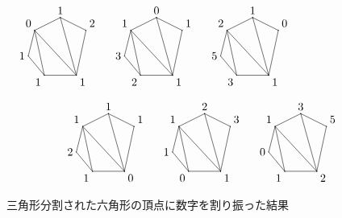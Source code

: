 \documentclass[12pt,twoside,dvipdfm]{jarticle}
\theoremstyle{definition} %
\theoremstyle{definition} %
\theoremstyle{definition} %
\numberwithin{theorem}{section}
\numberwithin{equation}{section}
\numberwithin{figure}{section}
\numberwithin{table}{section}
\begin{document}
\begin{figure}[hbtp!]
\[
\begin{xy}
{<0mm,0mm>;<1mm,0mm>:
(  0, 10)*+!D {1}="1",
(  8,  6)*+!LD{2}="2", 
(  5, -8)*+!LU{1}="4", 
( -5, -8)*+!UR{1}="5",
(-10, -2)*+!R {1}="6",
( -8,  6)*+!DR{0}="7", 
\ar@{-}"1";"2",
\ar@{-}"4";"5",
\ar@{-}"5";"6",
\ar@{-}"6";"7",
\ar@{-}"7";"1".
\ar@{-}"4";"2",
\ar@{-}"4";"1",
\ar@{-}"4";"7",
\ar@{-}"5";"7".
},
{<30mm,0mm>;<31mm,0mm>:
(  0, 10)*+!D {0}="1",
(  8,  6)*+!LD{1}="2", 
(  5, -8)*+!LU{1}="4", 
( -5, -8)*+!UR{2}="5",
(-10, -2)*+!R {3}="6",
( -8,  6)*+!DR{1}="7", 
\ar@{-}"1";"2",
\ar@{-}"4";"5",
\ar@{-}"5";"6",
\ar@{-}"6";"7",
\ar@{-}"7";"1".
\ar@{-}"4";"2",
\ar@{-}"4";"1",
\ar@{-}"4";"7",
\ar@{-}"5";"7".
},
{<60mm,0mm>;<61mm,0mm>:
(  0, 10)*+!D {1}="1",
(  8,  6)*+!LD{0}="2", 
(  5, -8)*+!LU{1}="4", 
( -5, -8)*+!UR{3}="5",
(-10, -2)*+!R {5}="6",
( -8,  6)*+!DR{2}="7", 
\ar@{-}"1";"2",
\ar@{-}"4";"5",
\ar@{-}"5";"6",
\ar@{-}"6";"7",
\ar@{-}"7";"1".
\ar@{-}"4";"2",
\ar@{-}"4";"1",
\ar@{-}"4";"7",
\ar@{-}"5";"7".
},
{<15mm,-30mm>;<16mm,-30mm>:
(  0, 10)*+!D {1}="1",
(  8,  6)*+!LD{1}="2", 
(  5, -8)*+!LU{0}="4", 
( -5, -8)*+!UR{1}="5",
(-10, -2)*+!R {2}="6",
( -8,  6)*+!DR{1}="7", 
\ar@{-}"1";"2",
\ar@{-}"4";"5",
\ar@{-}"5";"6",
\ar@{-}"6";"7",
\ar@{-}"7";"1".
\ar@{-}"4";"2",
\ar@{-}"4";"1",
\ar@{-}"4";"7",
\ar@{-}"5";"7".
},
{<45mm,-30mm>;<46mm,-30mm>:
(  0, 10)*+!D {2}="1",
(  8,  6)*+!LD{3}="2", 
(  5, -8)*+!LU{1}="4", 
( -5, -8)*+!UR{0}="5",
(-10, -2)*+!R {1}="6",
( -8,  6)*+!DR{1}="7", 
\ar@{-}"1";"2",
\ar@{-}"4";"5",
\ar@{-}"5";"6",
\ar@{-}"6";"7",
\ar@{-}"7";"1".
\ar@{-}"4";"2",
\ar@{-}"4";"1",
\ar@{-}"4";"7",
\ar@{-}"5";"7".
},
{<75mm,-30mm>;<76mm,-30mm>:
(  0, 10)*+!D {3}="1",
(  8,  6)*+!LD{5}="2", 
(  5, -8)*+!LU{2}="4", 
( -5, -8)*+!UR{1}="5",
(-10, -2)*+!R {0}="6",
( -8,  6)*+!DR{1}="7", 
\ar@{-}"1";"2",
\ar@{-}"4";"5",
\ar@{-}"5";"6",
\ar@{-}"6";"7",
\ar@{-}"7";"1".
\ar@{-}"4";"2",
\ar@{-}"4";"1",
\ar@{-}"4";"7",
\ar@{-}"5";"7".
},
\end{xy}
\]
\caption{三角形分割された六角形の頂点に数字を割り振った結果}
\label{fig:hexnum}
\end{figure}
\end{document}
